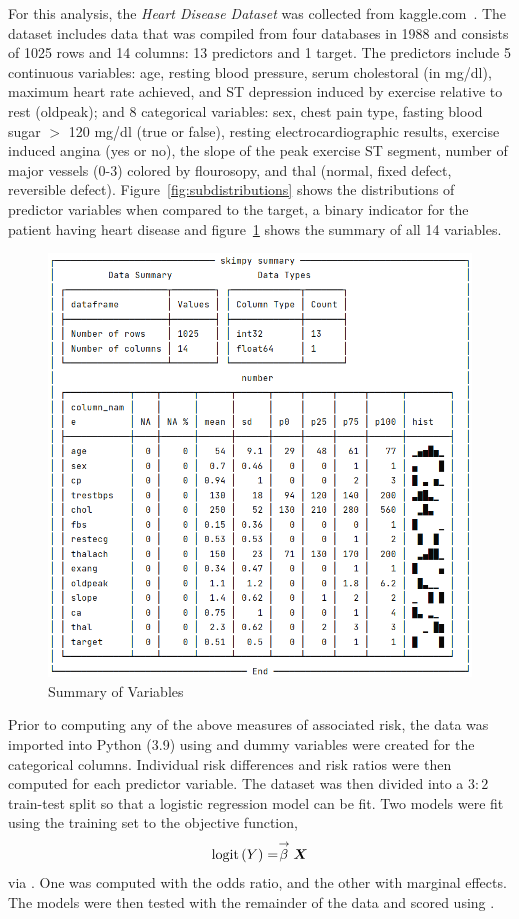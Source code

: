 For this analysis, the \emph{Heart Disease Dataset} was collected from kaggle.com~\citep{Heart-disease-dataset}.
The dataset includes data that was compiled from four databases in 1988 and consists of 1025 rows and 14 columns: 13 predictors and 1 target.
The predictors include 5 continuous variables: age, resting blood pressure, serum cholestoral (in mg/dl), maximum heart rate achieved, and ST depression induced by exercise relative to rest (oldpeak);
and 8 categorical variables: sex, chest pain type, fasting blood sugar $>$ 120 mg/dl (true or false), resting electrocardiographic results, exercise induced angina (yes or no), the slope of the peak exercise ST segment, number of major vessels (0-3) colored by flourosopy, and thal (normal, fixed defect, reversible defect).
Figure~\ref{fig:subdistributions} shows the distributions of predictor variables when compared to the target, a binary indicator for the patient having heart disease and figure~\ref{fig:skim} shows the  summary of all 14 variables.

\begin{figure}[tp]
    \centering
    \includegraphics[width=.7\textwidth]{plots/skimpy-summary}
     \caption[Figure]{Summary of Variables} \label{fig:skim}
\end{figure}

Prior to computing any of the above measures of associated risk, the data was imported into Python (3.9) using  and dummy variables were created for the categorical columns.
Individual risk differences and risk ratios were then computed for each predictor variable.
The dataset was then divided into a $3:2$ train-test split so that a logistic regression model can be fit.
Two models were fit using the training set to the objective function,
\begin{align*}
    \text{logit}\left( Y \right) = \stackrel{\rightarrow}{\beta}\boldsymbol{X}
\end{align*}
via .
One was computed with the odds ratio, and the other with marginal effects.
The models were then tested with the remainder of the data and scored using .

